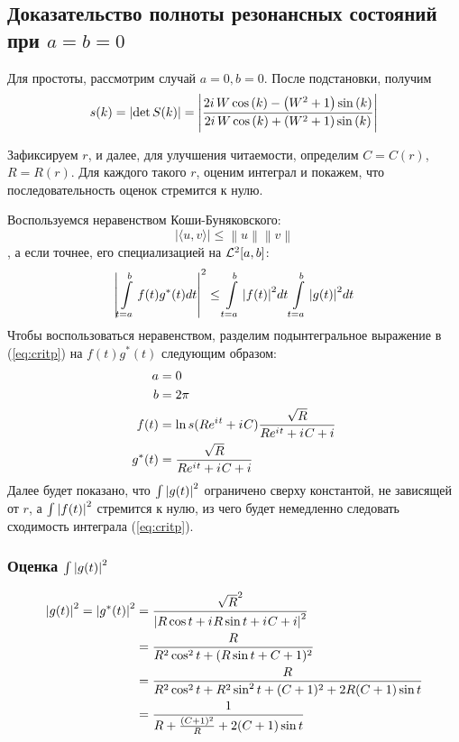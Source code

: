 \subsection{Доказательство полноты резонансных состояний при $a = b = 0$}
Для простоты, рассмотрим случай $a = 0, b = 0$. После подстановки, получим
\begin{equation}\label{eq:bundle_s}
s(k) = \abs{\det S(k)} = \abs{\frac{2 i \, W \cos\left(k\right) - {\left(W^{2} + 1\right)} \sin\left(k\right)}{2 i \, W \cos\left(k\right) + {\left(W^{2} + 1\right)} \sin\left(k\right)}}
\end{equation}


Зафиксируем $r$, и далее, для улучшения читаемости, определим $C = C(r)$, $R = R(r)$. Для каждого такого $r$, оценим интеграл и покажем, что последовательность оценок стремится к нулю.

Воспользуемся неравенством Коши-Буняковского:
\[
\big| \langle u,v \rangle \big| \leq \left\|u\right\| \left\|v\right\|
\]
, а если точнее, его специализацией на $\mathcal{L}^2[a, b]$:
\[
\abs{
\int\limits_{t=a}^{b} f(t) g^*(t) dt
}^2
\le
\int\limits_{t=a}^b \abs{f(t)}^2 dt 
\int\limits_{t=a}^b \abs{g(t)}^2 dt 
\]
% 
Чтобы воспользоваться неравенством, разделим подынтегральное выражение в (\ref{eq:critp}) на $f(t) g^*(t)$ следующим образом:
\begin{equation}\label{eq:split}
\begin{aligned}
a      &= 0 \\
b      &= 2 \pi \\
f(t)   &= \ln s(R e^{{i\mkern1mu} t} + {i\mkern1mu} C) \frac{\sqrt{R}}{R e^{{i\mkern1mu} t} + {i\mkern1mu} C + i} \\
g^*(t) &= \frac{\sqrt{R}}{R e^{{i\mkern1mu} t} + {i\mkern1mu} C + i}
\end{aligned}
\end{equation}
Далее будет показано, что $\int \abs{g(t)}^2$ ограничено сверху константой, не зависящей от $r$, а $\int \abs{f(t)}^2$ стремится к нулю, из чего будет немедленно следовать сходимость интеграла (\ref{eq:critp}).

\subsubsection{Оценка $\int \abs{g(t)}^2$}

\begin{align*}
\abs{g(t)}^2 = \abs{g^*(t)}^2
&=   \frac{\sqrt{R}^2}{\abs{R \cos t + {i\mkern1mu} R \sin t + {i\mkern1mu} C + i}^2} \\
&=   \frac{R}{R^2 \cos^2 t + (R \sin t + C + 1)^2} \\
&= \frac{R}{R^2 \cos^2 t + R^2 \sin^2 t + (C + 1)^2  + 2 R (C + 1) \sin t} \\
&=   \frac{1}{R + \frac{(C + 1)^2}{R} + 2 (C + 1) \sin t} \\ 
\end{align*}

